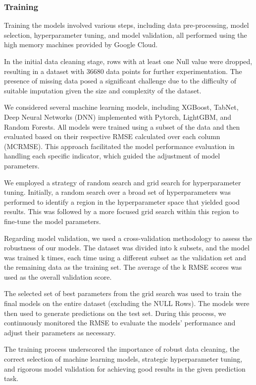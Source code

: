 \documentclass{article}
\begin{document}
\subsubsection{Training}

Training the models involved various steps, including data pre-processing, model selection, hyperparameter tuning, and model validation, all performed using the high memory machines provided by Google Cloud.

In the initial data cleaning stage, rows with at least one Null value were dropped, resulting in a dataset with 36680 data points for further experimentation. The presence of missing data posed a significant challenge due to the difficulty of suitable imputation given the size and complexity of the dataset.

We considered several machine learning models, including XGBoost, TabNet, Deep Neural Networks (DNN) implemented with Pytorch, LightGBM, and Random Forests. All models were trained using a subset of the data and then evaluated based on their respective RMSE calculated over each column (MCRMSE). This approach facilitated the model performance evaluation in handling each specific indicator, which guided the adjustment of model parameters.

We employed a strategy of random search and grid search for hyperparameter tuning. Initially, a random search over a broad set of hyperparameters was performed to identify a region in the hyperparameter space that yielded good results. This was followed by a more focused grid search within this region to fine-tune the model parameters.

Regarding model validation, we used a cross-validation methodology to assess the robustness of our models. The dataset was divided into k subsets, and the model was trained k times, each time using a different subset as the validation set and the remaining data as the training set. The average of the k RMSE scores was used as the overall validation score.

The selected set of best parameters from the grid search was used to train the final models on the entire dataset (excluding the NULL Rows). The models were then used to generate predictions on the test set. During this process, we continuously monitored the RMSE to evaluate the models' performance and adjust their parameters as necessary.

The training process underscored the importance of robust data cleaning, the correct selection of machine learning models, strategic hyperparameter tuning, and rigorous model validation for achieving good results in the given prediction task.
\end{document}
